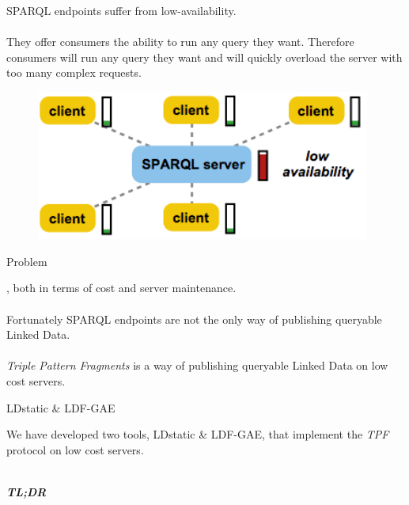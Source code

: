 \documentclass[20pt]{extarticle}
\newcommand{\cmr}{\fontencoding{T1}\fontfamily{cmr}\selectfont} %
\begin{document}
{\fontsize{30}{30} {\cmr 
\noindent SPARQL endpoints {\color{blue}suffer from low-availability.}
\\ \\
They offer consumers the ability to run any query they want. Therefore consumers will run any query they want and will quickly overload the server with too many complex requests.
}
\vspace{10 mm}
\begin{figure}[ht!]
\centering
\includegraphics[width=110mm]{sparql.png}
\end{figure}



\newpage

 \begin{center}
{\fontsize{35}{35}\color{blue} \sc Problem}
\end{center}

\vspace{10 mm}

{\fontsize{30}{30} {\cmr 
{}, both in terms of cost and server maintenance.
\\ \\
Fortunately SPARQL endpoints are not the only way of publishing queryable Linked Data.
\\ \\
\textit{Triple Pattern Fragments} is a way of publishing queryable Linked Data on low cost servers.
}} 

\newpage


\begin{center}
{\fontsize{35}{35}\color{blue} \sc LDstatic \& LDF-GAE}
\end{center}
\vspace{20 mm}
{\fontsize{30}{30} {\cmr 
\noindent We have developed two tools, LDstatic \& LDF-GAE, that implement the \textit{TPF} protocol on low cost servers.
\\ \\
{\color{blue} 
\textbf{\textit{TL;DR}}

}}}}
\end{document}
